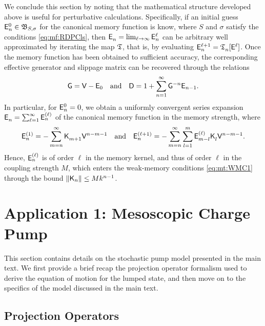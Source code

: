 \documentclass[aps,prl,reprint]{revtex4-2}
\begin{document}
We conclude this section by noting that the mathematical structure developed above is useful for perturbative calculations.
Specifically, if an initial guess $\mathsf{E}^0_n\in\mathfrak{B}_{S,\sigma}$ for the canonical memory function is know, where $S$ and $\sigma$ satisfy the conditions \eqref{eq:mf:RDPCls}, then $\mathsf{E}_n^{\vphantom{\ell}}=\lim_{\ell\rightarrow\infty}\mathsf{E}^\ell_n$ can be arbitrary well approximated by iterating the map $\mathfrak{T}$, that is, by evaluating $\mathsf{E}_n^{\ell +1} = \mathfrak{T}_n^{\vphantom{\ell}}[\mathsf{E}^\ell_{\vphantom{n}}]$.
Once the memory function has been obtained to sufficient accuracy, the corresponding effective generator and slippage matrix can be recovered through the relations
\begin{equation}
\mathsf{G} = \mathsf{V} -\mathsf{E}_0 \quad\text{and}\quad \mathsf{D} = 1 + \sum_{n=1}^\infty\mathsf{G}^{-n}\mathsf{E}_{n-1}.
\end{equation}
In particular, for $\mathsf{E}_n^0=0$, we obtain a uniformly convergent series expansion $\mathsf{E}_n^{\vphantom{\ell}} = \sum_{\ell=1}^\infty \mathsf{E}^{(\ell)}_n$ of the canonical memory function in the memory strength, where
\begin{equation}
\mathsf{E}_n^{(1)} = -\sum_{m=n}^\infty \mathsf{K}_{m+1}^{\vphantom{(\ell)}}\mathsf{V}^{n-m-1}
\quad\text{and}\quad
\mathsf{E}^{(\ell+1)}_n = - \sum_{m=n}^\infty\sum_{l=1}^m \mathsf{E}_{m-l}^{(\ell)}\mathsf{K}_l^{\vphantom{(\ell)}}\mathsf{V}^{n-m-1}.
\end{equation}
Hence, $\mathsf{E}^{(\ell)}_n$ is of order $\ell$ in the memory kernel, and thus of order $\ell$ in the coupling strength $M$, which enters the weak-memory conditions \eqref{eq:mt:WMC1} through the bound $\lVert \mathsf{K}_n \rVert\leq Mk^{n-1}$.

\newpage
\section{Application 1: Mesoscopic Charge Pump}

This section contains details on the stochastic pump model presented in the main text.
We first provide a brief recap the projection operator formalism used to derive the equation of motion for the lumped state, and then move on to the specifics of the model discussed in the main text.

\subsection{Projection Operators}
\end{document}
